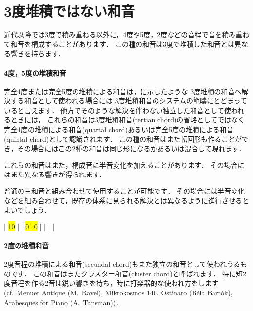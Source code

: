 \documentclass[dvipdfmx,uplatex,b5paper,openany,jbase=12Q,nomag*,textwidth-limit=44%
               ]{gachimuchi}[2020/05/05]
\begin{document}
\section{3度堆積ではない和音}
近代以降では3度で積み重ねる以外に，4度や5度，2度などの音程で音を積み重ねて和音を構成することがあります．
この種の和音は3度で堆積した和音とは異なる響きを持ちます．

\paragraph{4度，5度の堆積和音}
完全4度または完全5度の堆積による和音は，に示したような
3度堆積の和音へ解決する和音として使われる場合には
3度堆積和音のシステムの範疇にとどまっていると言えます．
他方でそのような解決を伴わない独立した和音として使われるときには，
これらの和音は3度堆積和音(tertian chord)の省略としてではなく
完全4度の堆積による和音(quartal chord)あるいは完全5度の堆積による和音(quintal chord)として認識されます．
この種の和音はまた転回形も作ることができ，その場合にはこの2種の和音は同じ形になるかあるいは混合して現れます．

\begin{Music}[0.6\linewidth]
  \nostartrule%
  \Startpiece%
  \Notes%
  \en\doublebar%
  \Notes%
  \en\doublebar%
  \Notes%
  \en\setdoublebar%
  \endpiece%
\end{Music}

これらの和音はまた，構成音に半音変化を加えることがあります．
その場合にはまた異なる響きが得られます．

普通の三和音と組み合わせて使用することが可能です．
その場合には半音変化などを組み合わせて，既存の体系に見られる解決とは異なるように進行させるとよいでしょう．
\begin{Music}[0.6\linewidth]
  \generalmeter{\meterC}%
  \Startpiece%
  \NOTes%
  |%
  \hl{1}\hl{0}%
  \en\bar%
  \NOTes%
  |%
  \hl{0}\hl{_0}%
  \en\bar%
  \NOTes%
  |%
  \en\bar%
  \NOTEs%
  |%
  \en\setdoublebar%
  \endpiece%
\end{Music}


\paragraph{2度の堆積和音}
2度音程の堆積による和音(secundal chord)もまた独立の和音として使われうるものです．
この和音はまたクラスター和音(cluster chord)と呼ばれます．
特に短2度音程を作る2音は鋭い響きを持ち，時に打楽器的な使われ方をします
(cf.\ Menuet Antique (M.~Ravel), Mikrokosmos 146. Ostinato (Béla Bartók), Arabesques for Piano (A.~Tansman))．
\end{document}
